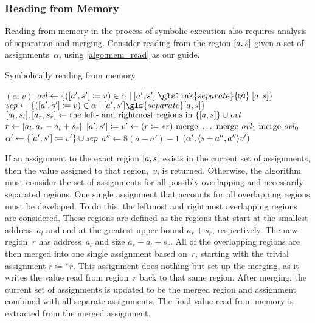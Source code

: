 \subsubsection{Reading from Memory}
Reading from memory in the process of symbolic execution
also requires analysis of separation and merging.
Consider reading from the region $[a,s]$ given a set of assignments~$\alpha$,
using \cref{algo:mem_read} as our guide.
\begin{algorithm}
  \caption{Symbolically reading from memory}\label{algo:mem_read}
  \begin{algorithmic}
        \State\Return $(\alpha,v)$
      \Else
        \State $\var{ovl}\gets\{(\region{a'}{s'}\coloneqq v)\in
        \alpha\mid\region{a'}{s'}\mathrel{\glslink{separate}{\not\bowtie}}\region as\}$
        \State $\var{sep}\gets\{(\region{a'}{s'}\coloneqq v)\in
        \alpha\mid\region{a'}{s'}\gls{separate}\region as\}$
        \State $[a_l,s_l],[a_r,s_r]\gets
        \text{the left- and rightmost regions in }\{[a,s]\}\cup\mathit{ovl}$
        \State $r\gets[a_l,a_r-a_l+s_r]$
        \State $[a',s']\coloneqq v'\gets
        (r\coloneqq *r)\text{ merge }\ldots\text{ merge }\mathit{ovl}_1\text{ merge }\mathit{ovl}_0$
        \State $\alpha'\gets\{[a',s']\coloneqq v'\}\cup\mathit{sep}$
        \State $a''\gets8(a-a')-1$
        \State\Return $(\alpha',\langle s+a'',a''\rangle v')$
      \EndIf
    \EndFunction
  \end{algorithmic}
\end{algorithm}
If an assignment to the exact region $[a,s]$
exists in the current set of assignments,
then the value assigned to that region,~$v$, is returned.
Otherwise, the algorithm must consider the set of assignments
for all possibly overlapping and necessarily separated regions.
One single assignment that accounts for all overlapping regions must be developed.
To do this, the leftmost and rightmost overlapping regions are considered.
These regions are defined as the regions that start at the smallest address~$a_l$
and end at the greatest upper bound $a_r+s_r$, respectively.
The new region~$r$ has address~$a_l$ and size $a_r-a_l+s_r$.
All of the overlapping regions are then merged into one single assignment based on~$r$,
starting with the trivial assignment $r\coloneqq *r$.
This assignment does nothing but set up the merging,
as it writes the value read from region~$r$ back to that same region.
After merging, the current set of assignments is updated to be the merged region
and assignment combined with all separate assignments.
The final value read from memory is extracted from the merged assignment.

